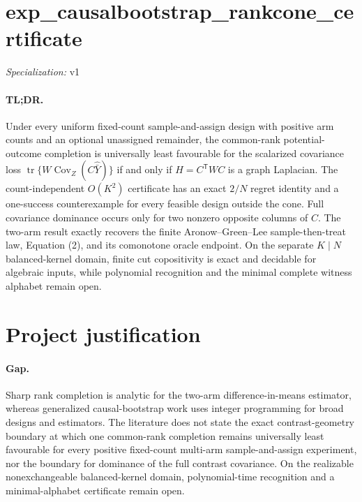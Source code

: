 \documentclass{article}
\begin{document}
\sloppy

\section*{exp\_\allowbreak{}causalbootstrap\_\allowbreak{}rankcone\_\allowbreak{}certificate}

\noindent\textit{Specialization:} v1\par

\paragraph{TL;DR.} Under every uniform fixed-count sample-and-assign design with positive arm counts and an optional unassigned remainder, the common-rank potential-outcome completion is universally least favourable for the scalarized covariance loss \(\operatorname{tr}\{W\operatorname{Cov}_Z(C\widehat{\bar Y})\}\) if and only if \(H=C^{\mathsf T}WC\) is a graph Laplacian.  The count-independent \(O(K^2)\) certificate has an exact \(2/N\) regret identity and a one-success counterexample for every feasible design outside the cone.  Full covariance dominance occurs only for two nonzero opposite columns of \(C\).  The two-arm result exactly recovers the finite Aronow--Green--Lee sample-then-treat law, Equation (2), and its comonotone oracle endpoint.  On the separate \(K\mid N\) balanced-kernel domain, finite cut copositivity is exact and decidable for algebraic inputs, while polynomial recognition and the minimal complete witness alphabet remain open.

\section{Project justification}

\paragraph{Gap.} Sharp rank completion is analytic for the two-arm difference-in-means estimator, whereas generalized causal-bootstrap work uses integer programming for broad designs and estimators.  The literature does not state the exact contrast-geometry boundary at which one common-rank completion remains universally least favourable for every positive fixed-count multi-arm sample-and-assign experiment, nor the boundary for dominance of the full contrast covariance.  On the realizable nonexchangeable balanced-kernel domain, polynomial-time recognition and a minimal-alphabet certificate remain open.
\end{document}
